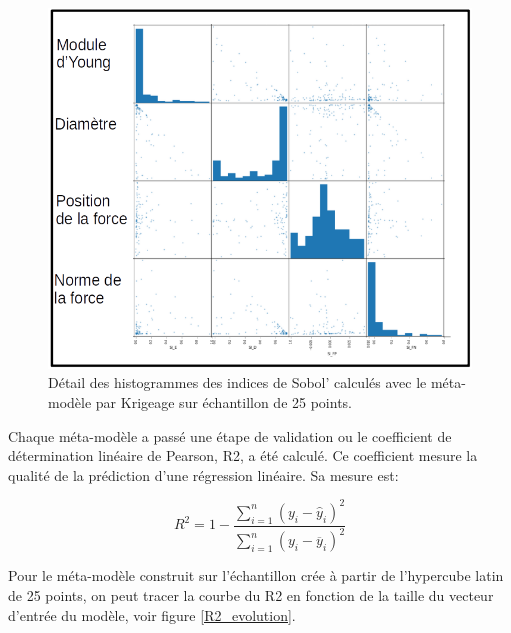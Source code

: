 \documentclass[a4paper,10pt]{article}
\begin{document}
\begin{figure}[H]
   \centering
   \noindent \includegraphics[width = \linewidth]{histogram_sobol_LHS25.png}
      \caption{Détail des histogrammes des  indices de Sobol' calculés avec le méta-modèle par Krigeage sur échantillon de 25 points.}
         \label{histogram_sobol_LHS25}
\end{figure}

Chaque méta-modèle a passé une étape de validation ou le coefficient de détermination linéaire de Pearson, R2, a été calculé. Ce coefficient mesure la qualité de la prédiction d'une régression linéaire. Sa mesure est:

\begin{equation}
R^{2} = 1 - \frac{\sum_{i=1}^{n}(y_{i}-\hat{y}_{i})^{2}}{\sum_{i=1}^{n}(y_{i}-\overline{y}_{i})^{2}}
\end{equation}

Pour le méta-modèle construit sur l'échantillon crée à partir de l'hypercube latin de 25 points, on peut tracer la courbe du R2 en fonction de la taille du vecteur d'entrée du modèle, voir figure \ref{R2_evolution}.
\end{document}
